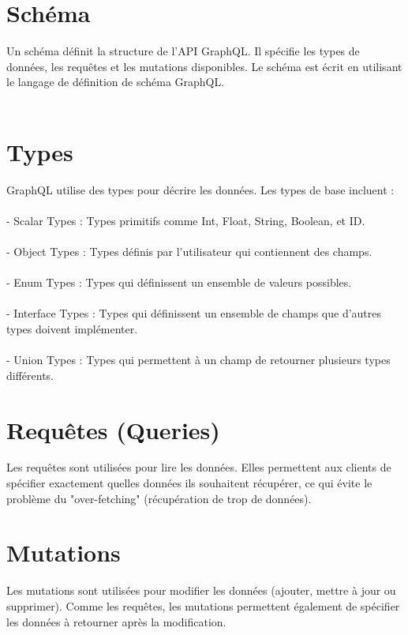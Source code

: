 \documentclass[a4paper,12pt]{article}
\begin{document}
\section*{Schéma} 
Un schéma définit la structure de l'API GraphQL. Il spécifie les types de données, les requêtes et les mutations disponibles. Le schéma est écrit en utilisant le langage de définition de schéma GraphQL.\\\\

\section*{Types}
GraphQL utilise des types pour décrire les données. Les types de base incluent :\\\\
- Scalar Types : Types primitifs comme Int, Float, String, Boolean, et ID.\\\\
- Object Types : Types définis par l'utilisateur qui contiennent des champs.\\\\
- Enum Types : Types qui définissent un ensemble de valeurs possibles.\\\\
- Interface Types : Types qui définissent un ensemble de champs que d'autres types doivent implémenter.\\\\
- Union Types : Types qui permettent à un champ de retourner plusieurs types différents.

\section*{Requêtes (Queries)}
Les requêtes sont utilisées pour lire les données. Elles permettent aux clients de spécifier exactement quelles données ils souhaitent récupérer, ce qui évite le problème du "over-fetching" (récupération de trop de données).

\section*{Mutations}
Les mutations sont utilisées pour modifier les données (ajouter, mettre à jour ou supprimer). Comme les requêtes, les mutations permettent également de spécifier les données à retourner après la modification.\\\\
\end{document}
